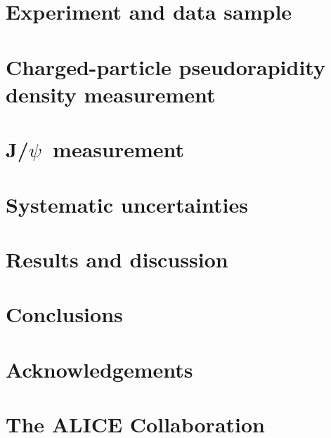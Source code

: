 \documentclass[ALICE,manyauthors]{cernphprep}
\newcommand{\jpsi}{\mbox{J/$\psi$ }}
\begin{document}
\section{Experiment and data sample}
\label{sec:data}


\section{Charged-particle pseudorapidity density measurement}
\label{sec:mult}


\section[J/psi measurement]{\jpsi measurement}
\label{sec:meas}


\section{Systematic uncertainties}
\label{sec:syst}


\section{Results and discussion}
\label{sec:res}


\section{Conclusions}
\label{sec:conc}

%
%

\newenvironment{acknowledgement}{\relax}{\relax}
\begin{acknowledgement}
\section*{Acknowledgements}
\end{acknowledgement}



\newpage
\appendix
%
%
\section{The ALICE Collaboration} \label{app:collab}
\end{document}
